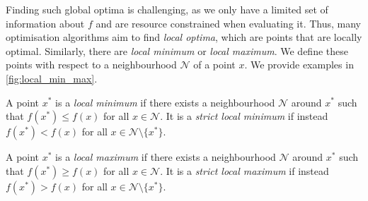 Finding such global optima is challenging, as we only have a limited set of information about $f$ and are resource constrained when evaluating it. Thus, many optimisation algorithms aim to find \textit{local optima}, which are points that are locally optimal. Similarly, there are \textit{local minimum} or \textit{local maximum}. We define these points with respect to a neighbourhood $\mathcal{N}$ of a point $x$. We provide examples in \cref{fig:local_min_max}.

\begin{definition}
    A point $x^*$ is a \textit{local minimum} if there exists a neighbourhood $\mathcal{N}$ around $x^*$ such that $f(x^*) \leq f(x)$ for all $x \in \mathcal{N}$. It is a \textit{strict local minimum} if instead $f(x^*) < f(x)$ for all $x \in \mathcal{N} \setminus \{x^*\}$.
\end{definition}

\begin{definition}
    A point $x^*$ is a \textit{local maximum} if there exists a neighbourhood $\mathcal{N}$ around $x^*$ such that $f(x^*) \geq f(x)$ for all $x \in \mathcal{N}$. It is a \textit{strict local maximum} if instead $f(x^*) > f(x)$ for all $x \in \mathcal{N} \setminus \{x^*\}$.
\end{definition}

